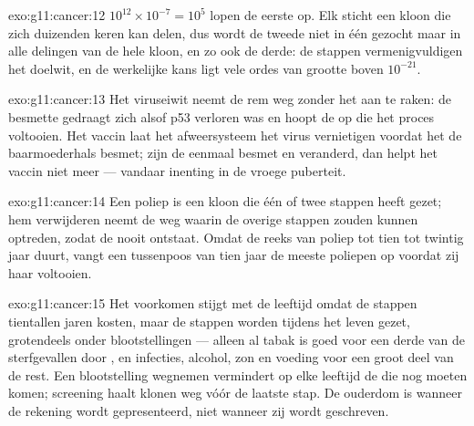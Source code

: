 \begin{solution}{exo:g11:cancer:12}
$10^{12} \times 10^{-7} = 10^5$  lopen de eerste  op. Elk
sticht een kloon die zich duizenden keren kan delen, dus wordt de tweede
 niet in één  gezocht maar in alle delingen van de hele kloon,
en zo ook de derde: de stappen vermenigvuldigen het doelwit, en de
werkelijke kans ligt vele ordes van grootte boven $10^{-21}$.
\end{solution}

\begin{solution}{exo:g11:cancer:13}
Het viruseiwit neemt de rem weg zonder het  aan te raken: de besmette
 gedraagt zich alsof p53 verloren was en hoopt de  op die het
proces voltooien. Het vaccin laat het afweersysteem het virus vernietigen
voordat het de baarmoederhals besmet; zijn de  eenmaal besmet en
veranderd, dan helpt het vaccin niet meer --- vandaar inenting in de
vroege puberteit.
\end{solution}

\begin{solution}{exo:g11:cancer:14}
Een poliep is een kloon die één of twee stappen heeft gezet; hem
verwijderen neemt de  weg waarin de overige stappen zouden kunnen
optreden, zodat de  nooit ontstaat. Omdat de reeks van poliep tot
 tien tot twintig jaar duurt, vangt een tussenpoos van tien jaar de
meeste poliepen op voordat zij haar voltooien.
\end{solution}

\begin{solution}{exo:g11:cancer:15}
Het voorkomen stijgt met de leeftijd omdat de stappen tientallen jaren
kosten, maar de stappen worden tijdens het leven gezet, grotendeels onder
blootstellingen --- alleen al tabak is goed voor een derde van de
sterfgevallen door , en infecties, alcohol, zon en voeding voor een
groot deel van de rest. Een blootstelling wegnemen vermindert op elke
leeftijd de  die nog moeten komen; screening haalt klonen weg
vóór de laatste stap. De ouderdom is wanneer de rekening wordt
gepresenteerd, niet wanneer zij wordt geschreven.
\end{solution}

